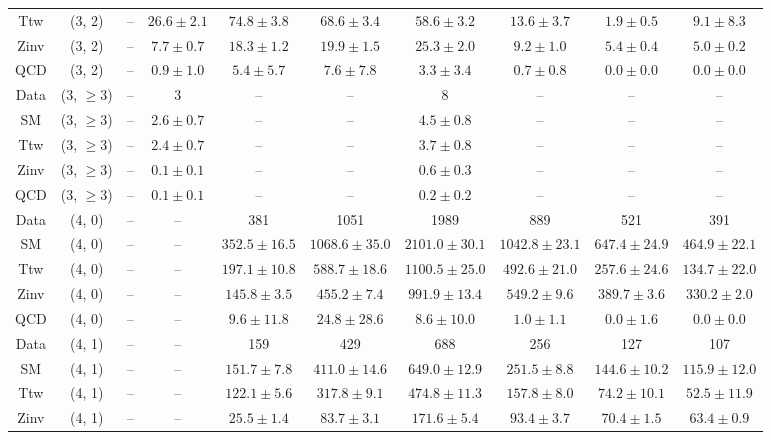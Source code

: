 \begin{table}[h!]
{\begin{tabular}{cccccccccc}
	Ttw & (3, 2) & -- & $26.6\pm 2.1$ & $74.8\pm 3.8$ & $68.6\pm 3.4$ & $58.6\pm 3.2$ & $13.6\pm 3.7$ & $1.9\pm 0.5$ & $9.1\pm 8.3$ \\[0.5ex] 
	Zinv & (3, 2) & -- & $7.7\pm 0.7$ & $18.3\pm 1.2$ & $19.9\pm 1.5$ & $25.3\pm 2.0$ & $9.2\pm 1.0$ & $5.4\pm 0.4$ & $5.0\pm 0.2$ \\[0.5ex] 
	QCD & (3, 2) & -- & $0.9\pm 1.0$ & $5.4\pm 5.7$ & $7.6\pm 7.8$ & $3.3\pm 3.4$ & $0.7\pm 0.8$ & $0.0\pm 0.0$ & $0.0\pm 0.0$ \\[0.5ex] 
	Data & (3, $\ge3$) & -- & 3 & -- & -- & 8 & -- & -- & -- \\[0.5ex] 
	SM & (3, $\ge3$) & -- & $2.6\pm 0.7$ & -- & -- & $4.5\pm 0.8$ & -- & -- & -- \\[0.5ex] 
	Ttw & (3, $\ge3$) & -- & $2.4\pm 0.7$ & -- & -- & $3.7\pm 0.8$ & -- & -- & -- \\[0.5ex] 
	Zinv & (3, $\ge3$) & -- & $0.1\pm 0.1$ & -- & -- & $0.6\pm 0.3$ & -- & -- & -- \\[0.5ex] 
	QCD & (3, $\ge3$) & -- & $0.1\pm 0.1$ & -- & -- & $0.2\pm 0.2$ & -- & -- & -- \\[0.5ex] 
	Data & (4, 0) & -- & -- & 381 & 1051 & 1989 & 889 & 521 & 391 \\[0.5ex] 
	SM & (4, 0) & -- & -- & $352.5\pm 16.5$ & $1068.6\pm 35.0$ & $2101.0\pm 30.1$ & $1042.8\pm 23.1$ & $647.4\pm 24.9$ & $464.9\pm 22.1$ \\[0.5ex] 
	Ttw & (4, 0) & -- & -- & $197.1\pm 10.8$ & $588.7\pm 18.6$ & $1100.5\pm 25.0$ & $492.6\pm 21.0$ & $257.6\pm 24.6$ & $134.7\pm 22.0$ \\[0.5ex] 
	Zinv & (4, 0) & -- & -- & $145.8\pm 3.5$ & $455.2\pm 7.4$ & $991.9\pm 13.4$ & $549.2\pm 9.6$ & $389.7\pm 3.6$ & $330.2\pm 2.0$ \\[0.5ex] 
	QCD & (4, 0) & -- & -- & $9.6\pm 11.8$ & $24.8\pm 28.6$ & $8.6\pm 10.0$ & $1.0\pm 1.1$ & $0.0\pm 1.6$ & $0.0\pm 0.0$ \\[0.5ex] 
	Data & (4, 1) & -- & -- & 159 & 429 & 688 & 256 & 127 & 107 \\[0.5ex] 
	SM & (4, 1) & -- & -- & $151.7\pm 7.8$ & $411.0\pm 14.6$ & $649.0\pm 12.9$ & $251.5\pm 8.8$ & $144.6\pm 10.2$ & $115.9\pm 12.0$ \\[0.5ex] 
	Ttw & (4, 1) & -- & -- & $122.1\pm 5.6$ & $317.8\pm 9.1$ & $474.8\pm 11.3$ & $157.8\pm 8.0$ & $74.2\pm 10.1$ & $52.5\pm 11.9$ \\[0.5ex] 
	Zinv & (4, 1) & -- & -- & $25.5\pm 1.4$ & $83.7\pm 3.1$ & $171.6\pm 5.4$ & $93.4\pm 3.7$ & $70.4\pm 1.5$ & $63.4\pm 0.9$ \\[0.5ex] 

\end{tabular}}
\end{table}
